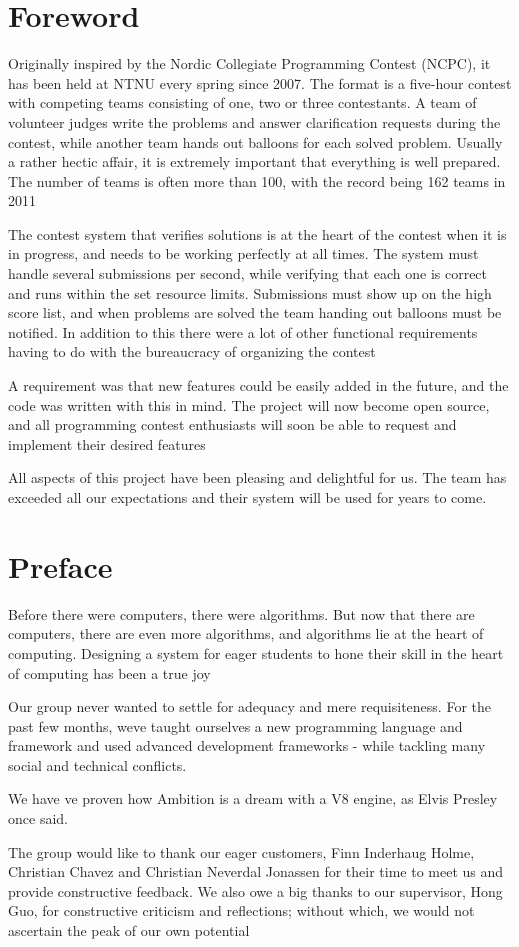 \section*{Foreword}
Originally inspired by the Nordic Collegiate Programming Contest (NCPC),
it has been held at NTNU every spring since 2007. The format is a
five-hour contest with competing teams consisting of one, two or three
contestants. A team of volunteer judges write the problems and answer
clarification requests during the contest, while another team hands out
balloons for each solved problem. Usually a rather hectic affair, it is
extremely important that everything is well prepared. The number of
teams is often more than 100, with the record being 162 teams in 2011

The contest system that verifies solutions is at the heart of the
contest when it is in progress, and needs to be working perfectly at
all times. The system must handle several submissions per second, while
verifying that each one is correct and runs within the set resource
limits. Submissions must show up on the high score list, and when
problems are solved the team handing out balloons must be notified. In
addition to this there were a lot of other functional requirements
having to do with the bureaucracy of organizing the contest

A requirement was that new features could be easily added in the future,
and the code was written with this in mind. The project will now become
open source, and all programming contest enthusiasts will soon be able
to request and implement their desired features

All aspects of this project have been pleasing and delightful for us.
The team has exceeded all our expectations and their system will be
used for years to come.

\pagebreak

\section*{Preface}

Before there were computers, there were algorithms. But now that there are
computers, there are even more algorithms, and algorithms lie at the heart of
computing. Designing a system for eager students to hone their skill in the
heart of computing has been a true joy

Our group never wanted to settle for adequacy and mere requisiteness.  For the
past few months, weve taught ourselves a new programming language and framework
and used advanced development frameworks - while tackling many social and
technical conflicts.

We have ve proven how Ambition is a dream with a V8 engine, as Elvis Presley
once said.

The group would like to thank our eager customers, Finn Inderhaug Holme,
Christian Chavez and Christian Neverdal Jonassen for their time to meet us and
provide constructive feedback. We also owe a big thanks to our supervisor, Hong
Guo, for constructive criticism and reflections; without which, we would not
ascertain the peak of our own potential
